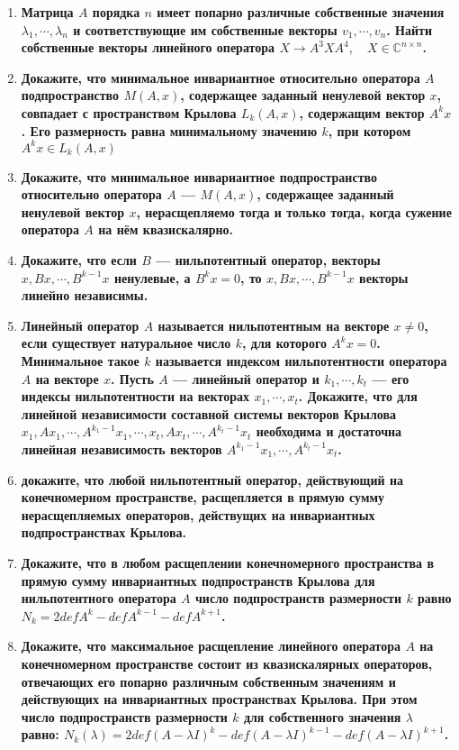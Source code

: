 \documentclass[12pt]{article} %
\begin{document}
\begin{enumerate}
    \item \textbf{Матрица $A$ порядка $n$ имеет попарно различные собственные значения $\lambda_1, \cdots ,\lambda_n$ и соответствующие им собственные векторы $v_1, \cdots, v_n $. Найти собственные векторы линейного оператора $X \rightarrow A^3XA^4, \quad X \in \mathds{C}^{n \times n}$.}
    \item \textbf{Докажите, что минимальное инвариантное относительно оператора $A$ подпространство $M(A, x)$, содержащее заданный ненулевой вектор $x$, совпадает с пространством Крылова $L_k(A, x)$, содержащим вектор $A^kx$. Его размерность равна минимальному значению $k$, при котором $A^kx \in L_k(A, x)$}
    \item \textbf{Докажите, что минимальное инвариантное подпространство относительно оператора $A$ --- $M(A, x)$, содержащее заданный ненулевой вектор $x$, нерасщепляемо тогда и только тогда, когда сужение оператора $A$ на нём квазискалярно.}
    \item \textbf{Докажите, что если $B$ --- нильпотентный оператор, векторы $x, Bx, \cdots, B^{k - 1}x$ ненулевые, а $B^kx = 0$, то $x, Bx, \cdots, B^{k - 1}x$ векторы линейно независимы.}
    \item \textbf{Линейный оператор $A$ называется нильпотентным на векторе $x \neq 0$, если существует натуральное число $k$, для которого $A^kx = 0$. Минимальное такое $k$ называется индексом нильпотентности оператора $A$  на векторе $x$. Пусть $A$ --- линейный оператор и $k_1, \cdots, k_t$ --- его индексы нильпотентности на векторах $x_1, \cdots, x_t$. Докажите, что для линейной независимости составной системы векторов Крылова $x_1, Ax_1, \cdots, A^{k_1 - 1}x_1, \cdots , x_t, Ax_t, \cdots, A^{k_t - 1}x_t$ необходима и достаточна линейная независимость векторов $A^{k_1 - 1}x_1, \cdots, A^{k_t - 1}x_t$.}
    \item \textbf{докажите, что любой нильпотентный оператор, действующий на конечномерном пространстве, расщепляется в прямую сумму нерасщепляемых операторов, действущих на инвариантных подпространствах Крылова.}
    \item \textbf{Докажите, что в любом расщеплении конечномерного пространства в прямую сумму инвариантных подпространств Крылова для нильпотентного оператора $A$ число подпространств размерности $k$ равно $N_k= 2defA^k - defA^{k - 1} - defA^{k + 1}$.}
    \item \textbf{Докажите, что максимальное расщепление линейного оператора $A$ на конечномерном пространстве состоит из квазискалярных операторов, отвечающих его попарно различным собственным значениям и действующих на инвариантных пространствах Крылова. При этом число подпространств размерности $k$ для собственного значения $\lambda$ равно: $N_k(\lambda) = 2def(A - \lambda I)^k - def(A - \lambda I)^{k - 1} - def(A - \lambda I)^{k + 1}$.}

\end{enumerate}
\end{document}

